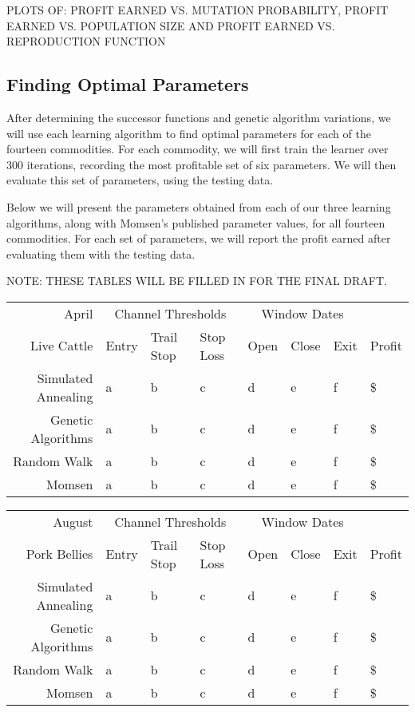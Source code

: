 \documentclass[12pt]{article}
\begin{document}
PLOTS OF: PROFIT EARNED VS. MUTATION PROBABILITY, PROFIT EARNED VS. POPULATION
SIZE AND PROFIT EARNED VS. REPRODUCTION FUNCTION



\subsection{Finding Optimal Parameters}


After determining the successor functions and genetic algorithm variations, we
will use each learning algorithm to find optimal parameters for each of the
fourteen commodities. For each commodity, we will first train the learner over
300 iterations, recording the most profitable set of six parameters. We will
then evaluate this set of parameters, using the testing data.

Below we will present the parameters obtained from each of our three learning
algorithms, along with Momsen's published parameter values, for all fourteen
commodities. For each set of parameters, we will report the profit earned after
evaluating them with the testing data.


NOTE: THESE TABLES WILL BE FILLED IN FOR THE FINAL DRAFT.

\begin{tabular}{|r|l|l|l|l|l|l|l|}
  \hline
  April & \multicolumn{3}{|c|}{Channel Thresholds} & \multicolumn{3}{|c|}{Window Dates} &  \\
  Live Cattle & Entry & Trail Stop & Stop Loss & Open & Close & Exit & Profit\\ \hline
  Simulated Annealing & a & b & c & d & e & f & \$ \\ \hline
  Genetic Algorithms & a & b & c & d & e & f & \$ \\ \hline
  Random Walk & a & b & c & d & e & f & \$ \\ \hline
  Momsen &  a & b & c & d & e & f & \$ \\ \hline
\end{tabular}

\begin{tabular}{|r|l|l|l|l|l|l|l|}
  \hline
  August & \multicolumn{3}{|c|}{Channel Thresholds} & \multicolumn{3}{|c|}{Window Dates} &  \\
  Pork Bellies & Entry & Trail Stop & Stop Loss & Open & Close & Exit & Profit\\ \hline
  Simulated Annealing & a & b & c & d & e & f & \$ \\ \hline
  Genetic Algorithms & a & b & c & d & e & f & \$ \\ \hline
  Random Walk & a & b & c & d & e & f & \$ \\ \hline
  Momsen &  a & b & c & d & e & f & \$ \\ \hline
\end{tabular}
\end{document}
